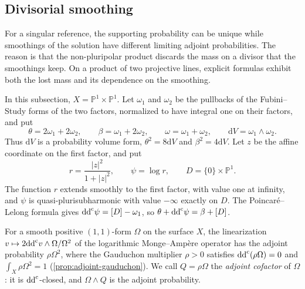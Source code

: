 \subsection{Divisorial smoothing}
\label{sec:divisorial-adjoint-obstruction}

For a singular reference, the supporting probability can be unique while smoothings of the solution have different limiting adjoint probabilities. The reason is that the non-pluripolar product discards the mass on a divisor that the smoothings keep. On a product of two projective lines, explicit formulas exhibit both the lost mass and its dependence on the smoothing.

In this subsection, $X=\mathbb P^1\times\mathbb P^1$. Let $\omega_1$ and $\omega_2$ be the pullbacks of the Fubini--Study forms of the two factors, normalized to have integral one on their factors, and put
\[
 \theta=2\omega_1+2\omega_2,\qquad
 \beta=\omega_1+2\omega_2,\qquad
 \omega=\omega_1+\omega_2,\qquad
 \mathrm dV=\omega_1\wedge\omega_2.
\]
Thus $\mathrm dV$ is a probability volume form, $\theta^2=8\mathrm dV$ and $\beta^2=4\mathrm dV$. Let $z$ be the affine coordinate on the first factor, and put
\[
 r=\frac{|z|^2}{1+|z|^2},\qquad \psi=\log r,\qquad
 D=\{0\}\times\mathbb P^1.
\]
The function $r$ extends smoothly to the first factor, with value one at infinity, and $\psi$ is quasi-plurisubharmonic with value $-\infty$ exactly on $D$. The Poincar\'e--Lelong formula gives $\mathrm{dd}^{\mathrm{c}}\psi=[D]-\omega_1$, so $\theta+\mathrm{dd}^{\mathrm{c}}\psi=\beta+[D]$.

For a smooth positive $(1,1)$-form $\Omega$ on the surface $X$, the linearization $v\mapsto2\mathrm{dd}^{\mathrm{c}} v\wedge\Omega/\Omega^2$ of the logarithmic Monge--Amp\`ere operator has the adjoint probability $\rho\Omega^2$, where the Gauduchon multiplier $\rho>0$ satisfies $\mathrm{dd}^{\mathrm{c}}(\rho\Omega)=0$ and $\int_X\rho\Omega^2=1$ (\cref{prop:adjoint-gauduchon}). We call $Q=\rho\Omega$ the \emph{adjoint cofactor} of $\Omega$: it is $\mathrm{dd}^{\mathrm{c}}$-closed, and $\Omega\wedge Q$ is the adjoint probability.

